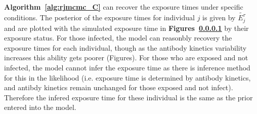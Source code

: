 \paragraph{} \textbf{Algorithm~\ref{alg:rjmcmc_C}} can recover the exposure times under specific conditions. The posterior of the exposure times for individual $j$ is given by $\tilde{E^\tau_j}$ and are plotted with the simulated exposure time in \textbf{Figures~\ref{} } by their exposure status. For those infected, the model can reasonbly recovery the exposure times for each individual, though as the antibody kinetics variability increases this ability gets poorer (Figures). For those who are exposed and not infected, the model cannot infer the exposure time as there is inference method for this in the likelihood (i.e. exposure time is determined by antibody kinetics, and antibdy kinetics remain unchanged for those exposed and not infect). Therefore the infered exposure time for these individual is the same as the prior entered into the model. 


